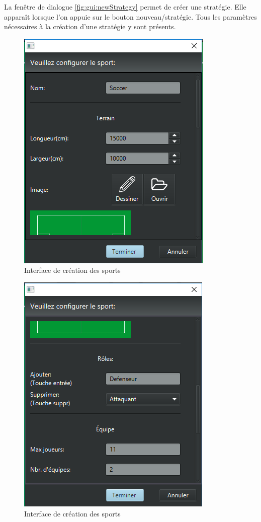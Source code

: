 La fenêtre de dialogue \ref{fig:gui:newStrategy} permet de créer une stratégie.
Elle apparaît lorsque l'on appuie sur le bouton nouveau/stratégie.
Tous les paramètres nécessaires à la création d'une stratégie y sont présents.

\begin{figure}[htpb]
    \centering
    \includegraphics[scale=0.6]{fig/gui/newSport1.png}
    \caption{Interface de création des sports}
    \label{fig:gui:newSport1}
\end{figure}

\begin{figure}[htpb]
    \centering
    \includegraphics[scale=0.6]{fig/gui/newSport2.png}
    \caption{Interface de création des sports}
    \label{fig:gui:newSport2}
\end{figure}

